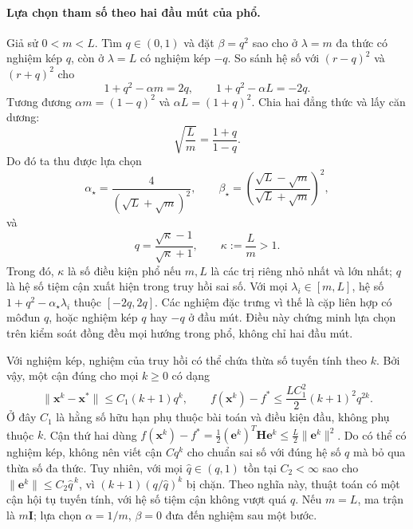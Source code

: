 \paragraph{Lựa chọn tham số theo hai đầu mút của phổ.}
Giả sử $0<m<L$. Tìm $q\in(0,1)$ và đặt $\beta=q^2$ sao cho ở
$\lambda=m$ đa thức có nghiệm kép $q$, còn ở $\lambda=L$ có nghiệm kép
$-q$. So sánh hệ số với $(r-q)^2$ và $(r+q)^2$ cho
\begin{equation}
 1+q^2-\alpha m=2q,
 \qquad 1+q^2-\alpha L=-2q.
 \label{eq:mom-endpoints}
\end{equation}
Tương đương $\alpha m=(1-q)^2$ và $\alpha L=(1+q)^2$.
Chia hai đẳng thức và lấy căn dương:
\[
 \sqrt{\frac{L}{m}}=\frac{1+q}{1-q}.
\]
Do đó ta thu được lựa chọn
\begin{equation}
 \boxed{\alpha_{\star}=\frac{4}{(\sqrt{L}+\sqrt{m})^2},\qquad
 \beta_{\star}=\left(\frac{\sqrt{L}-\sqrt{m}}
                          {\sqrt{L}+\sqrt{m}}\right)^2,}
 \label{eq:mom-optimal-parameters}
\end{equation}
và
\begin{equation}
 q=\frac{\sqrt{\kappa}-1}{\sqrt{\kappa}+1},
 \qquad \kappa:=\frac{L}{m}>1.
 \label{eq:mom-factor}
\end{equation}
Trong đó, $\kappa$ là số điều kiện phổ nếu $m,L$ là các trị riêng nhỏ
nhất và lớn nhất; $q$ là hệ số tiệm cận xuất hiện trong truy hồi sai số.
Với mọi $\lambda_i\in[m,L]$, hệ số
$1+q^2-\alpha_{\star}\lambda_i$ thuộc $[-2q,2q]$.
Các nghiệm đặc trưng vì thế là cặp liên hợp có môđun $q$, hoặc nghiệm
kép $q$ hay $-q$ ở đầu mút. Điều này chứng minh lựa chọn trên kiểm soát
đồng đều mọi hướng trong phổ, không chỉ hai đầu mút.

Với nghiệm kép, nghiệm của truy hồi có thể chứa thừa số tuyến tính
theo $k$. Bởi vậy, một cận đúng cho mọi $k\geq0$ có dạng
\begin{equation}
 \|\mathbf{x}^{k}-\mathbf{x}^{*}\|\leq C_1(k+1)q^k,
 \qquad
 f(\mathbf{x}^{k})-f^{*}\leq\frac{L C_1^2}{2}(k+1)^2q^{2k}.
 \label{eq:mom-quadratic-rate}
\end{equation}
Ở đây $C_1$ là hằng số hữu hạn phụ thuộc bài toán và điều kiện đầu,
không phụ thuộc $k$. Cận thứ hai dùng
$f(\mathbf{x}^{k})-f^{*}=\tfrac12(\mathbf{e}^{k})^T
\mathbf{H}\mathbf{e}^{k}\leq\tfrac{L}{2}\|\mathbf{e}^{k}\|^2$.
Do có thể có nghiệm kép, không nên viết cận $Cq^k$ cho chuẩn sai số với
đúng hệ số $q$ mà bỏ qua thừa số đa thức. Tuy nhiên, với mọi
$\widehat q\in(q,1)$ tồn tại $C_2<\infty$ sao cho
$\|\mathbf{e}^{k}\|\leq C_2\widehat q^{\,k}$, vì
$(k+1)(q/\widehat q)^k$ bị chặn. Theo nghĩa này, thuật toán có một cận
hội tụ tuyến tính, với hệ số tiệm cận không vượt quá $q$.
Nếu $m=L$, ma trận là $m\mathbf{I}$; lựa chọn
$\alpha=1/m$, $\beta=0$ đưa đến nghiệm sau một bước.

